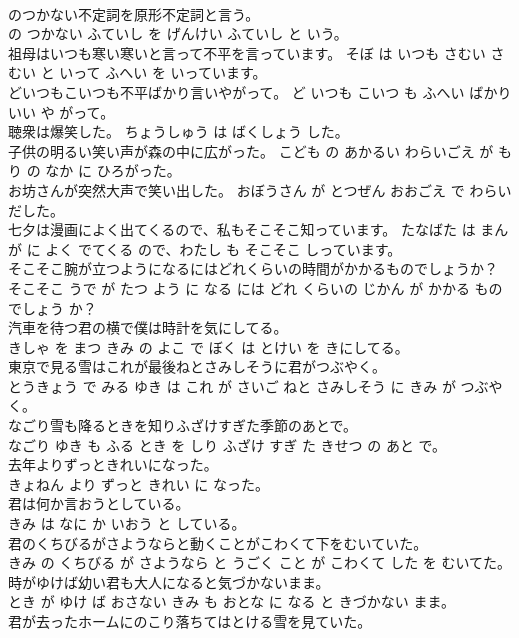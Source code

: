 \documentclass[8pt]{extreport}
\begin{document}
\begin{CJK}{UTF8}{min}
\\	のつかない不定詞を原形不定詞と言う。	
\\	の つかない ふていし を げんけい ふていし と いう。	
\\	祖母はいつも寒い寒いと言って不平を言っています。	そぼ は いつも さむい さむい と いって ふへい を いっています。	
\\	どいつもこいつも不平ばかり言いやがって。	ど いつも こいつ も ふへい ばかり いい や がって。	
\\	聴衆は爆笑した。	ちょうしゅう は ばくしょう した。	
\\	子供の明るい笑い声が森の中に広がった。	こども の あかるい わらいごえ が もり の なか に ひろがった。	
\\	お坊さんが突然大声で笑い出した。	おぼうさん が とつぜん おおごえ で わらい だした。	
\\	七夕は漫画によく出てくるので、私もそこそこ知っています。	たなばた は まんが に よく でてくる ので、わたし も そこそこ しっています。	
\\	そこそこ腕が立つようになるにはどれくらいの時間がかかるものでしょうか？	そこそこ うで が たつ よう に なる には どれ くらいの じかん が かかる もの でしょう か？	
\\	汽車を待つ君の横で僕は時計を気にしてる。	
\\	きしゃ を まつ きみ の よこ で ぼく は とけい を きにしてる。	
\\	東京で見る雪はこれが最後ねとさみしそうに君がつぶやく。	
\\	とうきょう で みる ゆき は これ が さいご ねと さみしそう に きみ が つぶやく。	
\\	なごり雪も降るときを知りふざけすぎた季節のあとで。	
\\	なごり ゆき も ふる とき を しり ふざけ すぎ た きせつ の あと で。	
\\	去年よりずっときれいになった。	
\\	きょねん より ずっと きれい に なった。	
\\	君は何か言おうとしている。	
\\	きみ は なに か いおう と している。	
\\	君のくちびるがさようならと動くことがこわくて下をむいていた。	
\\	きみ の くちびる が さようなら と うごく こと が こわくて した を むいてた。	
\\	時がゆけば幼い君も大人になると気づかないまま。	
\\	とき が ゆけ ば おさない きみ も おとな に なる と きづかない まま。	
\\	君が去ったホームにのこり落ちてはとける雪を見ていた。	

\end{CJK}
\end{document}

